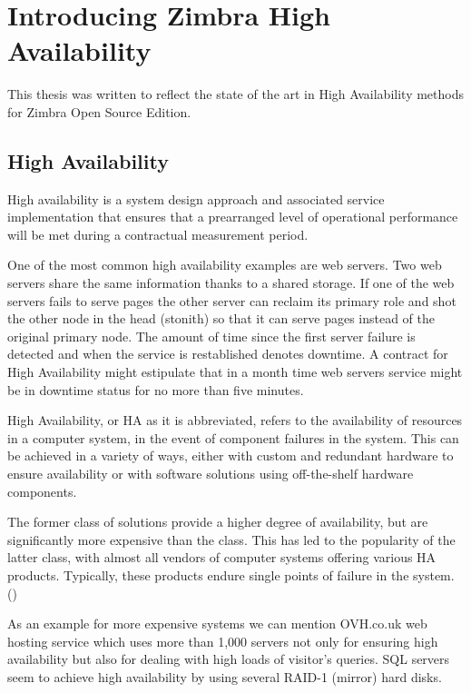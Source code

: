 

\chapter{Introducing Zimbra High Availability}
This thesis was written to reflect the state of the art in High Availability methods for Zimbra Open Source Edition.  

\section {High Availability}
High availability is a system design approach and associated service implementation that ensures that a prearranged level of operational performance will be met during a contractual measurement period.

One of the most common high availability examples are web servers. Two web servers share the same information thanks to a shared storage. If one of the web servers fails to serve pages the other server can reclaim its primary role and shot the other node in the head (stonith) so that it can serve pages instead of the original primary node. The amount of time since the first server failure is detected and when the service is restablished denotes downtime. A contract for High Availability might estipulate that in a month time web servers service might be in downtime status for no more than five minutes.

High Availability, or HA as it is abbreviated, refers to the availability of resources in a computer system, in the event of component failures in the system. This can be achieved in a variety of ways, either with custom and redundant hardware to ensure availability or with software solutions using off-the-shelf hardware components.

The former class of solutions provide a higher degree of availability, but are significantly more expensive than the class. This has led to the popularity of the latter class, with almost all vendors of computer systems offering various HA products. Typically, these products endure single points of failure in the system. (\cite{TaskForceHA})

As an example for more expensive systems we can mention OVH.co.uk web hosting service which uses more than 1,000 servers not only for ensuring high availability but also for dealing with high loads of visitor's queries. SQL servers seem to achieve high availability by using several RAID-1 (mirror) hard disks.

